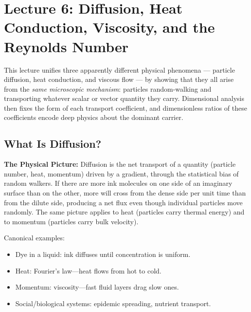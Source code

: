 \section{Lecture 6: Diffusion, Heat Conduction, Viscosity, and the Reynolds Number}
\label{sec:lec06}
\date{14/05/2026}

This lecture unifies three apparently different physical phenomena — particle
diffusion, heat conduction, and viscous flow — by showing that they all arise
from the \emph{same microscopic mechanism}: particles random-walking and
transporting whatever scalar or vector quantity they carry. Dimensional analysis
then fixes the form of each transport coefficient, and dimensionless ratios of
these coefficients encode deep physics about the dominant carrier.

\subsection{What Is Diffusion?}
\label{sec:lec06:diffusion-intro}

\textbf{The Physical Picture:}
Diffusion is the net transport of a quantity (particle number, heat, momentum)
driven by a gradient, through the statistical bias of random walkers. If there
are more ink molecules on one side of an imaginary surface than on the other,
more will cross from the dense side per unit time than from the dilute side,
producing a net flux even though individual particles move randomly. The same
picture applies to heat (particles carry thermal energy) and to momentum
(particles carry bulk velocity).

Canonical examples:
\begin{itemize}
    \item Dye in a liquid: ink diffuses until concentration is uniform.
    \item Heat: Fourier's law—heat flows from hot to cold.
    \item Momentum: viscosity—fast fluid layers drag slow ones.
    \item Social/biological systems: epidemic spreading, nutrient transport.
\end{itemize}

